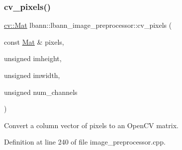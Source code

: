 \subsubsection{\texorpdfstring{cv\+\_\+pixels()}{cv\_pixels()}}
{\footnotesize\ttfamily \hyperlink{base_8hpp_a68f11fdc31b62516cb310831bbe54d73}{cv\+::\+Mat} lbann\+::lbann\+\_\+image\+\_\+preprocessor\+::cv\+\_\+pixels (\begin{DoxyParamCaption}\item[{const \hyperlink{base_8hpp_a68f11fdc31b62516cb310831bbe54d73}{Mat} \&}]{pixels,  }\item[{unsigned}]{imheight,  }\item[{unsigned}]{imwidth,  }\item[{unsigned}]{num\+\_\+channels }\end{DoxyParamCaption})\hspace{0.3cm}{\ttfamily [protected]}}

Convert a column vector of pixels to an Open\+CV matrix. 

Definition at line 240 of file image\+\_\+preprocessor.\+cpp.


